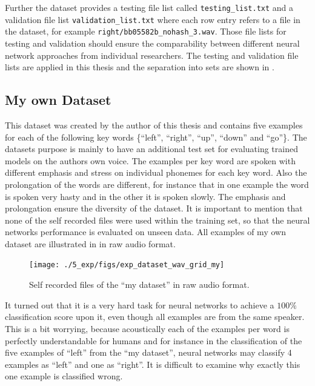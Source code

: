Further the dataset provides a testing file list called \texttt{testing\_list.txt} and a validation file list \texttt{validation\_list.txt} where each row entry refers to a file in the dataset, for example \texttt{right/bb05582b\_nohash\_3.wav}.
Those file lists for testing and validation should ensure the comparability between different neural network approaches from individual researchers.
The testing and validation file lists are applied in this thesis and the separation into sets are shown in .



\subsection{My own Dataset}\label{sec:exp_dataset_my}
This dataset was created by the author of this thesis and contains five examples for each of the following key words \{\enquote{left}, \enquote{right}, \enquote{up}, \enquote{down} and \enquote{go}\}.
The datasets purpose is mainly to have an additional test set for evaluating trained models on the authors own voice.
The examples per key word are spoken with different emphasis and stress on individual phonemes for each key word.
Also the prolongation of the words are different, for instance that in one example the word is spoken very hasty and in the other it is spoken slowly.
The emphasis and prolongation ensure the diversity of the dataset. 
It is important to mention that none of the self recorded files were used within the training set, so that the neural networks performance is evaluated on unseen data.
All examples of my own dataset are illustrated in  in raw audio format.
\begin{figure}[!ht]
  \centering
    \texttt{[image: ./5\_exp/figs/exp\_dataset\_wav\_grid\_my]}
  \caption{Self recorded files of the \enquote{my dataset} in raw audio format.}
  \label{fig:exp_dataset_wav_grid_my}
\end{figure}
\FloatBarrier
\noindent
It turned out that it is a very hard task for neural networks to achieve a $100\%$ classification score upon it, even though all examples are from the same speaker.
This is a bit worrying, because acoustically each of the examples per word is perfectly understandable for humans and for instance in the classification of the five examples of \enquote{left} from the \enquote{my dataset}, neural networks may classify 4 examples as \enquote{left} and one as \enquote{right}.
It is difficult to examine why exactly this one example is classified wrong.


